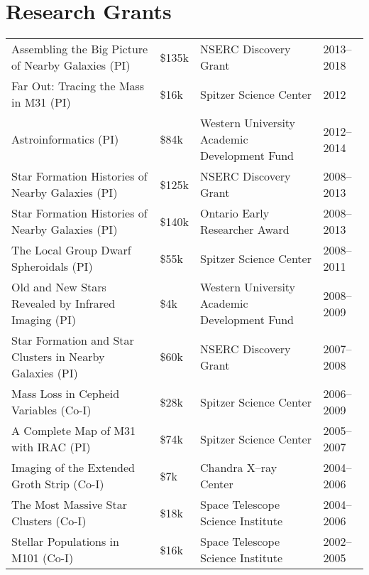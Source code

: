 \documentclass[12pt]{article}
\begin{document}
\section{Research Grants}

\begin{tabular}{p{8cm}lp{5cm}l}

Assembling the Big Picture of Nearby Galaxies (PI)& \$135k & NSERC Discovery Grant & 2013--2018 \\ 

Far Out: Tracing the Mass in M31 (PI)& \$16k& Spitzer Science Center & 2012\\ 

Astroinformatics (PI)& \$84k& Western University Academic Development Fund& 2012--2014\\ 

 Star Formation Histories of Nearby Galaxies (PI)& \$125k& NSERC Discovery Grant & 2008--2013\\ 

Star Formation Histories of Nearby Galaxies (PI)& \$140k& Ontario Early Researcher Award& 2008--2013\\ 

 The Local Group Dwarf Spheroidals (PI)& \$55k& Spitzer Science Center & 2008--2011\\ 

Old and New Stars Revealed by Infrared Imaging (PI)& \$4k& Western University Academic Development Fund & 2008--2009\\

Star Formation and Star Clusters in Nearby Galaxies (PI)& \$60k& NSERC Discovery Grant&2007--2008\\ 

Mass Loss in Cepheid Variables (Co-I)& \$28k& Spitzer Science Center & 2006--2009\\ 

 A Complete Map of M31 with IRAC (PI)& \$74k& Spitzer Science Center & 2005--2007\\

Imaging of the Extended Groth Strip (Co-I)& \$7k& Chandra X--ray Center& 2004--2006\\ 

The Most Massive Star Clusters (Co-I)& \$18k & Space Telescope Science Institute& 2004--2006\\ 

Stellar Populations in M101 (Co-I)& \$16k & Space Telescope Science Institute& 2002--2005\\ 
\end{tabular}
\end{document}
